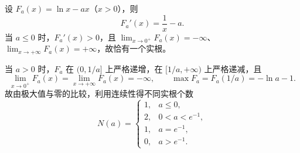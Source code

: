 设 $F_a(x)=\ln x-ax$（$x>0$），则
\[
F_a'(x)=\frac1x-a.
\]
当 $a\le0$ 时，$F_a'(x)>0$，且 $\lim_{x\to0^+}F_a(x)=-\infty$、$\lim_{x\to+\infty}F_a(x)=+\infty$，故恰有一个实根。

当 $a>0$ 时，$F_a$ 在 $(0,1/a]$ 上严格递增，在 $[1/a,+\infty)$ 上严格递减，且
\[
\lim_{x\to0^+}F_a(x)=\lim_{x\to+\infty}F_a(x)=-\infty,\qquad
\max F_a=F_a(1/a)=-\ln a-1.
\]
故由极大值与零的比较，利用连续性得不同实根个数
\[
\boxed{
N(a)=\begin{cases}
1,&a\le0,\\
2,&0<a<e^{-1},\\
1,&a=e^{-1},\\
0,&a>e^{-1}.
\end{cases}}
\]
